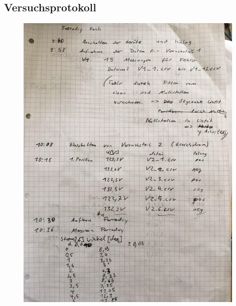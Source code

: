 \subsection{Versuchsprotokoll}
\FloatBarrier
\begin{figure}[ht]
	\centering
	\includegraphics[scale=0.5]{Bilder/protokoll_1}
\end{figure}
